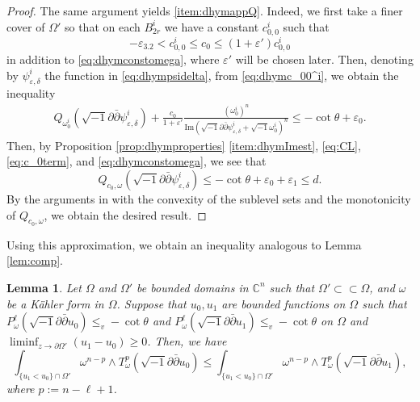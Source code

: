 \documentclass{amsart}
\numberwithin{equation}{section}
\theoremstyle{plain}
\newtheorem{lem}[equation]{Lemma}
\theoremstyle{definition}
\theoremstyle{remark}
\newcommand{\delb}{\sqrt{-1}\partial\bar{\partial}}
\begin{document}
\begin{proof}
     The same argument yields \ref{item:dhymappQ}. Indeed, we first take a finer cover of $\Omega'$ so that on each $B^i_{2r}$ we have a constant $c_{0,0}^i$ such that
     \begin{equation}\label{eq:dhymc_00^i}
         -\varepsilon_{3.2}<c_{0,0}^i\le c_0\le (1+\varepsilon')c_{0,0}^i
     \end{equation}
     in addition to \eqref{eq:dhymconstomega}, where $\varepsilon'$ will be chosen later. Then, denoting by $\psi^i_{\varepsilon,\delta}$ the function in \eqref{eq:dhympsidelta}, from \eqref{eq:dhymc_00^i}, we obtain the inequality
     \begin{equation}
         \begin{aligned}
             Q_{\omega_0^i}(\delb \psi^i_{\varepsilon,\delta})+\frac{c_0}{1+\varepsilon'}\frac{(\omega_0^i)^n}{\mathrm{Im}(\delb\psi^i_{\varepsilon,\delta}+\sqrt{-1}\omega_0^i)^n}\le-\cot\theta+\varepsilon_0.
         \end{aligned}
     \end{equation}
     Then, by Proposition \ref{prop:dhymproperties} \ref{item:dhymImest}, \eqref{eq:CL}, \eqref{eq:c_0term}, and \eqref{eq:dhymconstomega}, we see that $$Q_{c_0,\omega}(\delb\psi_{\varepsilon,\delta}^i)\le-\cot\theta+\varepsilon_0+\varepsilon_1\le d.$$
     By the arguments in \cite[p561--p562]{GChen} with the convexity of the sublevel sets and the monotonicity of $Q_{c_0,\omega}$, we obtain the desired result.
\end{proof}

Using this approximation, we obtain an inequality analogous to Lemma \ref{lem:comp}.

\begin{lem}\label{lem:dhymcomp}
    Let $\Omega$ and $\Omega'$ be bounded domains in $\mathbb{C}^n$ such that $\Omega'\subset\subset\Omega$, and $\omega$ be a Kähler form in $\Omega$. Suppose that $u_0,u_1$ are bounded functions on $\Omega$ such that $P^\ell_\omega(\delb u_0)\le_v-\cot\theta$ and $P^\ell_\omega(\delb u_1)\le_v -\cot\theta$ on $\Omega$ and $\liminf_{z\to\partial\Omega'}(u_1-u_0)\ge0$. Then, we have
    \begin{equation}
        \int_{\{u_1<u_0\}\cap\Omega'}\omega^{n-p}\wedge T^p_\omega(\delb u_0)\le\int_{\{u_1<u_0\}\cap\Omega'}\omega^{n-p}\wedge T^p_\omega(\delb u_1),
    \end{equation}
    where $p:=n-\ell+1$. 
\end{lem}
\end{document}
